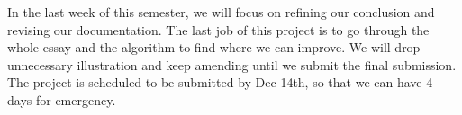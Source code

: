 \documentclass{article}
\begin{document}
In the last week of this semester, we will focus on refining our conclusion and revising our documentation.
The last job of this project is to go through the whole essay and the algorithm to find where we can improve.
We will drop unnecessary illustration and keep amending until we submit the final submission.
The project is scheduled to be submitted by Dec 14th, so that we can have 4 days for emergency.





\end{document}
